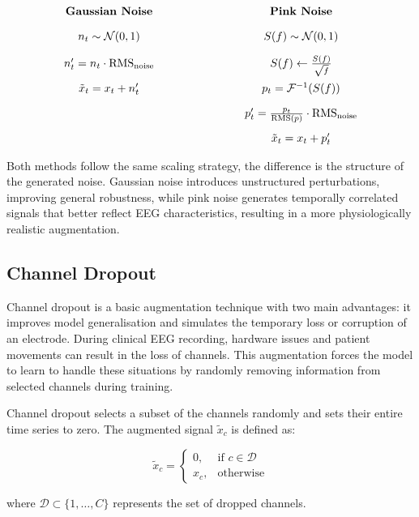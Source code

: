 \[
\setlength{\arraycolsep}{40pt}
\begin{array}{cc}
\textbf{Gaussian Noise} & \textbf{Pink Noise} \\[10pt]

n_t \sim \mathcal{N}(0,1) 
&
S(f) \sim \mathcal{N}(0,1)
\\[10pt]

n_t' = n_t \cdot \mathrm{RMS}_{\text{noise}}
&
S(f) \leftarrow \frac{S(f)}{\sqrt{f}}
\\[10pt]

\tilde{x}_t = x_t + n_t'
&
p_t = \mathcal{F}^{-1}(S(f))
\\[10pt]

&
p_t' = \frac{p_t}{\mathrm{RMS}(p)} \cdot \mathrm{RMS}_{\text{noise}}
\\[10pt]

&
\tilde{x}_t = x_t + p_t'

\end{array}
\]

Both methods follow the same scaling strategy, the difference is the structure of the generated noise. Gaussian noise introduces unstructured perturbations, improving general robustness, while pink noise generates temporally correlated signals that better reflect EEG characteristics, resulting in a more physiologically realistic augmentation. 

\subsection{Channel Dropout}

Channel dropout is a basic augmentation technique with two main advantages: it improves model generalisation and simulates the temporary loss or corruption of an electrode. During clinical EEG recording, hardware issues and patient movements can result in the loss of channels. This augmentation forces the model to learn to handle these situations by randomly removing information from selected channels during training.

Channel dropout selects a subset of the channels randomly and sets their entire time series to zero. The augmented signal $\tilde{x}_c$ is defined as:

\[
\tilde{x}_c =
\begin{cases}
0, & \text{if } c \in \mathcal{D} \\
x_c, & \text{otherwise}
\end{cases}
\]

where $\mathcal{D} \subset \{1, \dots, C\}$ represents the set of dropped channels. 

